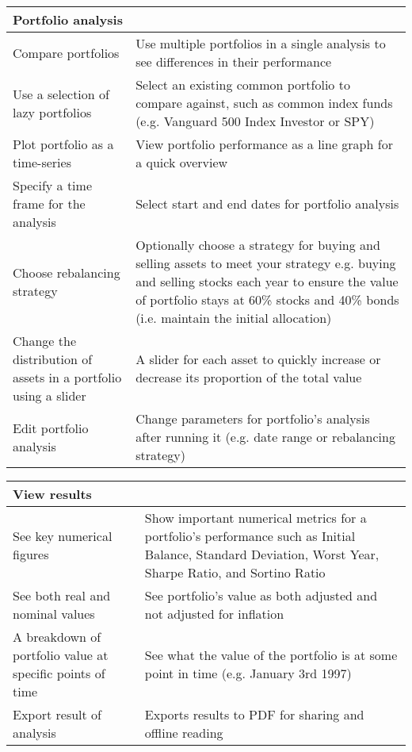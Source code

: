 \documentclass[main.tex]{subfiles}
\begin{document}
{
\setlength{\tabcolsep}{30pt}
\renewcommand{\arraystretch}{2}
\centering
{}
\begin{tabularx}{\linewidth}{|X|X|}
\hline
 \textbf{Portfolio analysis}  &  \\
 \hline
 Compare portfolios & Use multiple portfolios in a single analysis to see differences in their performance \\
\hline
Use a selection of  lazy portfolios & Select an existing common portfolio to compare against, such as common index funds (e.g. Vanguard 500 Index Investor or SPY) \\
\hline
Plot portfolio as a time-series & View portfolio performance as a line graph for a quick overview \\
\hline
Specify a time frame for the analysis & Select start and end dates for portfolio analysis \\
\hline
Choose rebalancing strategy & Optionally choose a strategy for buying and selling assets to meet your strategy e.g. buying and selling stocks each year to ensure the value of portfolio stays at 60\% stocks and 40\% bonds (i.e. maintain the initial allocation) \\
\hline
Change the distribution of assets in a portfolio using a slider & A slider for each asset to quickly increase or decrease its proportion of the total value \\
\hline
Edit portfolio analysis & Change parameters for portfolio's analysis after running it (e.g. date range or rebalancing strategy) \\
\hline
\end{tabularx}
}

\vspace{0.5cm}

{
\setlength{\tabcolsep}{30pt}
\renewcommand{\arraystretch}{2}
\centering
{}
\begin{tabularx}{\linewidth}{|X|X|}
\hline
 \textbf{View results}  &  \\
 \hline
 See key numerical figures & Show important numerical metrics for a portfolio's performance such as Initial Balance, Standard Deviation, Worst Year, Sharpe Ratio, and Sortino Ratio \\
\hline
See both real and nominal values & See portfolio's value as both adjusted and not adjusted for inflation \\
\hline
A breakdown of portfolio value at specific points of time & See what the value of the portfolio is at some point in time (e.g. January 3rd 1997) \\
\hline
Export result of analysis & Exports results to PDF for sharing and offline reading \\
\hline
\end{tabularx}
}
\end{document}
